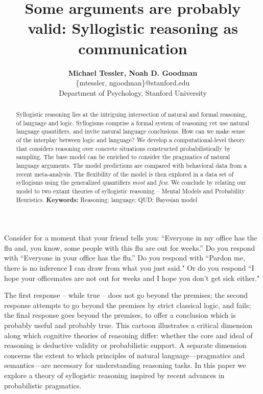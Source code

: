 \documentclass[10pt,letterpaper]{article}
\begin{document}
\title{Some arguments are probably valid: Syllogistic reasoning as communication}
 
\author{{\large \bf Michael Tessler, Noah D. Goodman } \\
	\{mtessler, ngoodman\}@stanford.edu \\
  Department of Psychology, Stanford University}

\maketitle


\begin{abstract}
Syllogistic reasoning lies at the intriguing intersection of natural and formal reasoning, of language and logic. Syllogisms comprise a formal system of reasoning yet use natural language quantifiers, and invite natural language conclusions. How can we make sense of the interplay between logic and language? We develop a computational-level theory that considers reasoning over concrete situations constructed probabilistically by sampling. The base model can be enriched to consider the pragmatics of natural language arguments. The model predictions are compared with behavioral data from a recent meta-analysis. The flexibility of the model is then explored in a data set of syllogisms using the generalized quantifiers \emph{most} and \emph{few}. We conclude by relating our model to two extant theories of syllogistic reasoning -- Mental Models and Probability Heuristics. \textbf{Keywords:} 
Reasoning; language; QUD; Bayesian model
\end{abstract}


Consider for a moment that your friend tells you:
``Everyone in my office has the flu and, you know, some people with this flu are out for weeks.''
Do you respond with
``Everyone in your office has the flu.''
Do you respond with
``Pardon me, there is no inference I can draw from what you just said."
Or do you respond
 ``I hope your officemates are not out for weeks and I hope you don't get sick either."
 
 
 The first response -- while true -- does not go beyond the premises; the second response attempts to go beyond the premises by strict classical logic, and fails; the final response goes beyond the premises, to offer a conclusion which is probably useful and probably true.
% 
This cartoon illustrates a critical dimension along which cognitive theories of reasoning differ: whether the core and ideal of reasoning is deductive validity or probabilistic support. A separate dimension concerns the extent to which principles of natural language---pragmatics and semantics---are necessary for understanding reasoning tasks. In this paper we explore a theory of syllogistic reasoning inspired by recent advances in probabilistic pragmatics.
\end{document}
